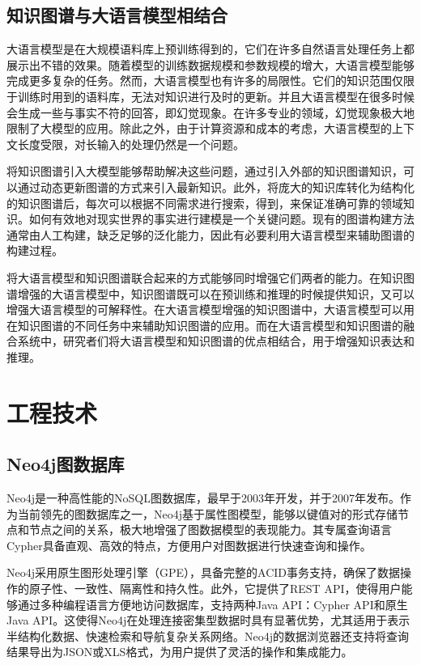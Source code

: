 \subsection{知识图谱与大语言模型相结合}

大语言模型是在大规模语料库上预训练得到的，它们在许多自然语言处理任务上都展示出不错的效果。随着模型的训练数据规模和参数规模的增大，大语言模型能够完成更多复杂的任务。然而，大语言模型也有许多的局限性。它们的知识范围仅限于训练时用到的语料库\cite{AlKhamissi2022}，无法对知识进行及时的更新。并且大语言模型在很多时候会生成一些与事实不符的回答\cite{Ji2023}，即幻觉现象。在许多专业的领域，幻觉现象极大地限制了大模型的应用。除此之外，由于计算资源和成本的考虑，大语言模型的上下文长度受限，对长输入的处理仍然是一个问题。

将知识图谱引入大模型能够帮助解决这些问题，通过引入外部的知识图谱知识，可以通过动态更新图谱的方式来引入最新知识。此外，将庞大的知识库转化为结构化的知识图谱后，每次可以根据不同需求进行搜索，得到，来保证准确可靠的领域知识。如何有效地对现实世界的事实进行建模是一个关键问题。现有的图谱构建方法通常由人工构建，缺乏足够的泛化能力，因此有必要利用大语言模型来辅助图谱的构建过程。

将大语言模型和知识图谱联合起来的方式能够同时增强它们两者的能力。在知识图谱增强的大语言模型中，知识图谱既可以在预训练和推理的时候提供知识\cite{Zhang2019}，又可以增强大语言模型的可解释性\cite{Lin2019}。在大语言模型增强的知识图谱中，大语言模型可以用在知识图谱的不同任务中来辅助知识图谱的应用。而在大语言模型和知识图谱的融合系统中，研究者们将大语言模型和知识图谱的优点相结合，用于增强知识表达\cite{Yasunaga2022}和推理\cite{Choudhary2023}。

\section{工程技术}

\subsection{Neo4j图数据库}

Neo4j是一种高性能的NoSQL图数据库，最早于2003年开发，并于2007年发布。作为当前领先的图数据库之一，Neo4j基于属性图模型，能够以键值对的形式存储节点和节点之间的关系，极大地增强了图数据模型的表现能力。其专属查询语言Cypher具备直观、高效的特点，方便用户对图数据进行快速查询和操作。

Neo4j采用原生图形处理引擎（GPE），具备完整的ACID事务支持，确保了数据操作的原子性、一致性、隔离性和持久性。此外，它提供了REST API，使得用户能够通过多种编程语言方便地访问数据库，支持两种Java API：Cypher API和原生Java API。这使得Neo4j在处理连接密集型数据时具有显著优势，尤其适用于表示半结构化数据、快速检索和导航复杂关系网络。Neo4j的数据浏览器还支持将查询结果导出为JSON或XLS格式，为用户提供了灵活的操作和集成能力。

